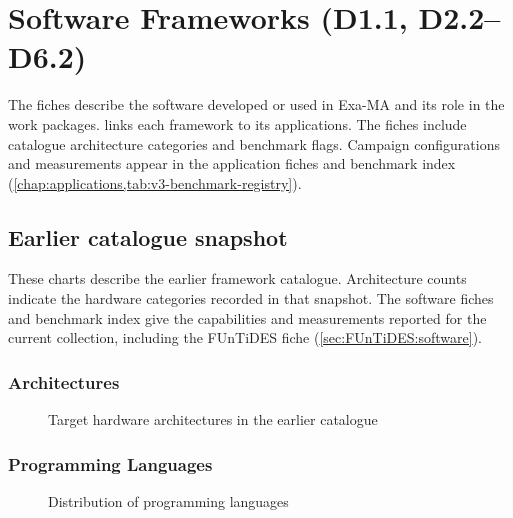 \clearpage
\chapter{Software Frameworks (D1.1, D2.2--D6.2)}
\label{chap:software}

The fiches describe the software developed or used in Exa-MA and its
role in the work packages.  links
each framework to its applications. The fiches include catalogue architecture categories and benchmark flags.
Campaign configurations and measurements appear in the application fiches
and benchmark index
(\cref{chap:applications,tab:v3-benchmark-registry}).

\section{Earlier catalogue snapshot}
\label{sec:software:statistics}

These charts describe the earlier framework catalogue. Architecture
counts indicate the hardware categories recorded in that snapshot.
The software fiches and benchmark index give the capabilities and
measurements reported for the current collection, including the
FUnTiDES fiche (\cref{sec:FUnTiDES:software}).

\subsection{Architectures}

\begin{figure}[H]
\centering
{}
\caption{Target hardware architectures in the earlier catalogue}
\label{fig:arch}
\end{figure}


\subsection{Programming Languages}

\begin{figure}[H]
\centering
{}
\caption{Distribution of programming languages}
\label{fig:languages}
\end{figure}


